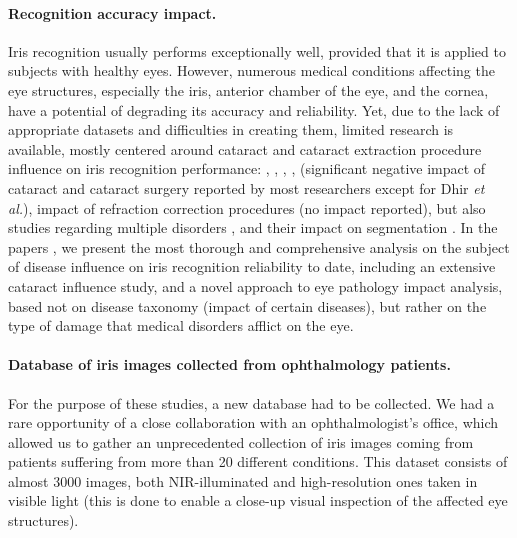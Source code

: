 \documentclass[a4paper,twoside]{article}
\begin{document}
\paragraph{Recognition accuracy impact.}
Iris recognition usually performs exceptionally well, provided that it is applied to subjects with healthy eyes. However, numerous medical conditions affecting the eye structures, especially the iris, anterior chamber of the eye, and the cornea, have a potential of degrading its accuracy and reliability. Yet, due to the lack of appropriate datasets and difficulties in creating them, limited research is available, mostly centered around cataract and cataract extraction procedure influence on iris recognition performance: \cite{Roizenblatt}, \cite{Seyeddain2014}, \cite{Dhir}, \cite{TrokielewiczWilga2014}, \cite{RamachandraCataractICB2016} (significant negative impact of cataract and cataract surgery reported by most researchers except for Dhir \emph{et al.}), impact of refraction correction procedures \cite{Yuan} (no impact reported), but also studies regarding multiple disorders \cite{Aslam}, and their impact on segmentation \cite{McConnon2012}. In the papers \cite{TrokielewiczCYBCONF2015}, \cite{TrokielewiczBTAS2015} we present the most thorough and comprehensive analysis on the subject of disease influence on iris recognition reliability to date, including an extensive cataract influence study, and a novel approach to eye pathology impact analysis, based not on disease taxonomy (impact of certain diseases), but rather on the type of damage that medical disorders afflict on the eye. 

\paragraph{Database of iris images collected from ophthalmology patients.}
For the purpose of these studies, a new database had to be collected. We had a rare opportunity of a close collaboration with an ophthalmologist's office, which allowed us to gather an unprecedented collection of iris images coming from patients suffering from more than 20 different conditions. This dataset consists of almost 3000 images, both NIR-illuminated and high-resolution ones taken in visible light (this is done to enable a close-up visual inspection of the affected eye structures). 
\end{document}
